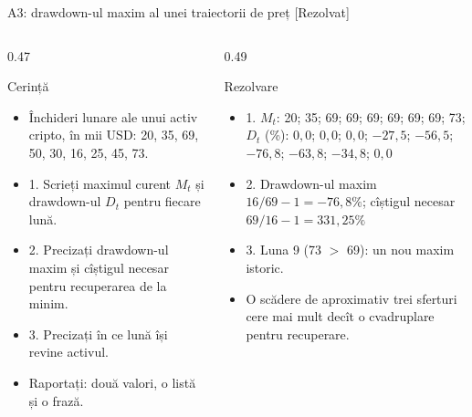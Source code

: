 \begin{frame}{A3: drawdown-ul maxim al unei traiectorii de preț [Rezolvat]}
\itemsize{\scriptsize}
\begin{columns}[T]
\begin{column}{0.47\textwidth}
\begin{block}{Cerință}
\begin{itemize}
    \item Închideri lunare ale unui activ cripto, în mii USD: 20, 35, 69, 50, 30, 16, 25, 45, 73.
    \item 1. Scrieți maximul curent $M_t$ și drawdown-ul $D_t$ pentru fiecare lună.
    \item 2. Precizați drawdown-ul maxim și cîștigul necesar pentru recuperarea de la minim.
    \item 3. Precizați în ce lună își revine activul.
    \item Raportați: două valori, o listă și o frază.
\end{itemize}
\end{block}
\end{column}
\begin{column}{0.49\textwidth}
\begin{exampleblock}{Rezolvare}
\begin{itemize}
    \item 1. $M_t$: 20; 35; 69; 69; 69; 69; 69; 69; 73; $D_t$ (\%): $0{,}0$; $0{,}0$; $0{,}0$; $-27{,}5$; $-56{,}5$; $-76{,}8$; $-63{,}8$; $-34{,}8$; $0{,}0$
    \item 2. Drawdown-ul maxim $16/69 - 1 = -76{,}8\%$; cîștigul necesar $69/16 - 1 = 331{,}25\%$
    \item 3. Luna 9 (73 $>$ 69): un nou maxim istoric.
    \item O scădere de aproximativ trei sferturi cere mai mult decît o cvadruplare pentru recuperare.
\end{itemize}
\end{exampleblock}
\end{column}
\end{columns}
\end{frame}

